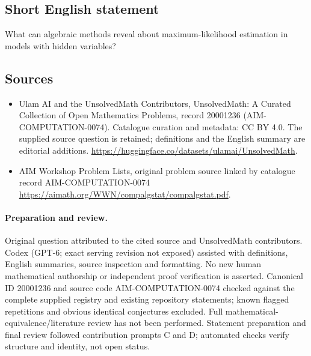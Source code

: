 \documentclass[11pt]{article}
\begin{document}
\subsection{Short English statement}
What can algebraic methods reveal about maximum-likelihood estimation in models with hidden variables?
\subsection{Sources}
\begin{itemize}
\item[\hypertarget{source:20001236:1}{S1}] Ulam AI and the UnsolvedMath Contributors, UnsolvedMath: A Curated Collection of Open Mathematics Problems, record 20001236 (AIM-COMPUTATION-0074). Catalogue curation and metadata: CC BY 4.0. The supplied source question is retained; definitions and the English summary are editorial additions.
\url{https://huggingface.co/datasets/ulamai/UnsolvedMath}.
\item[\hypertarget{source:20001236:2}{S2}] AIM Workshop Problem Lists, original problem source linked by catalogue record AIM-COMPUTATION-0074
\url{https://aimath.org/WWN/compalgstat/compalgstat.pdf}.
\end{itemize}
\paragraph{Preparation and review.}
Original question attributed to the cited source and UnsolvedMath contributors. Codex (GPT-6; exact serving revision not exposed) assisted with definitions, English summaries, source inspection and formatting. No new human mathematical authorship or independent proof verification is asserted. Canonical ID 20001236 and source code AIM-COMPUTATION-0074 checked against the complete supplied registry and existing repository statements; known flagged repetitions and obvious identical conjectures excluded. Full mathematical-equivalence/literature review has not been performed. Statement preparation and final review followed contribution prompts C and D; automated checks verify structure and identity, not open status.
\label{end:20001236}
\end{document}
